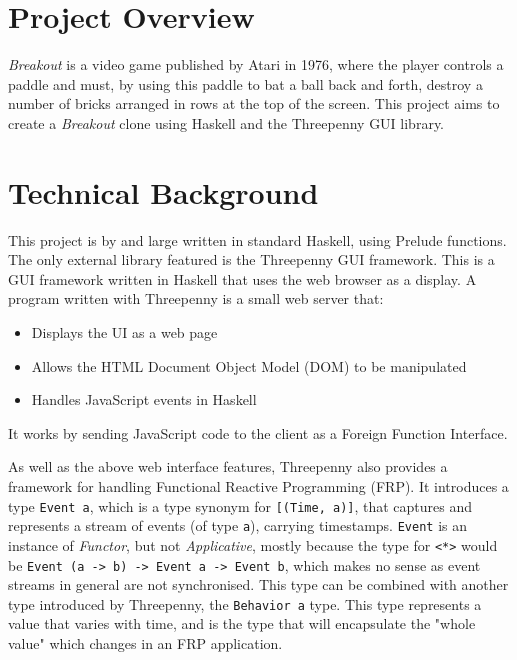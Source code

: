 \documentclass[12pt]{article}
\begin{document}
\maketitle
\tableofcontents

\section{Project Overview}

\textit{Breakout} is a video game published by Atari in 1976, where the player controls a paddle and must, by using this paddle to bat a ball back and forth, destroy a number of bricks arranged in rows at the top of the screen.
This project aims to create a \textit{Breakout} clone using Haskell and the Threepenny GUI library.

\section{Technical Background}

This project is by and large written in standard Haskell, using Prelude functions.
The only external library featured is the Threepenny GUI framework.
This is a GUI framework written in Haskell that uses the web browser as a display.
A program written with Threepenny is a small web server that:

\begin{itemize}
  \item Displays the UI as a web page
  \item Allows the HTML Document Object Model (DOM) to be manipulated
  \item Handles JavaScript events in Haskell
\end{itemize}

It works by sending JavaScript code to the client as a Foreign Function Interface.

\par

As well as the above web interface features, Threepenny also provides a framework for handling Functional Reactive Programming (FRP).
It introduces a type \verb|Event a|, which is a type synonym for \verb|[(Time, a)]|, that captures and represents a stream of events (of type \verb|a|), carrying timestamps.
\verb|Event| is an instance of \textit{Functor}, but not \textit{Applicative}, mostly because the type for \verb|<*>| would be \verb|Event (a -> b) -> Event a -> Event b|, which makes no sense as event streams in general are not synchronised.
This type can be combined with another type introduced by Threepenny, the \verb|Behavior a| type.
This type represents a value that varies with time, and is the type that will encapsulate the "whole value" which changes in an FRP application.
\end{document}
